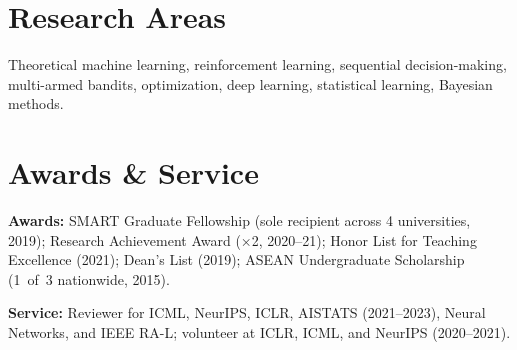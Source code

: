 \documentclass[10pt,a4paper]{article}
\begin{document}
\section{Research Areas}
{\color{soft}Theoretical machine learning, reinforcement learning, sequential decision-making, multi-armed bandits, optimization, deep learning, statistical learning, Bayesian methods.\par}

\section{Awards \& Service}
{\color{soft}
\textbf{\color{ink}Awards:} SMART Graduate Fellowship (sole recipient across 4 universities, 2019); Research Achievement Award (×2, 2020–21); Honor List for Teaching Excellence (2021); Dean's List (2019); ASEAN Undergraduate Scholarship (1~of~3 nationwide, 2015).\par
\vspace{2pt}
\textbf{\color{ink}Service:} Reviewer for ICML, NeurIPS, ICLR, AISTATS (2021–2023), Neural Networks, and IEEE RA-L; volunteer at ICLR, ICML, and NeurIPS (2020–2021).\par}
\end{document}
